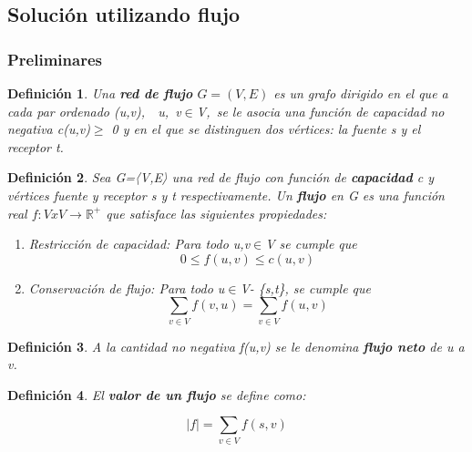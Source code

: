 \documentclass[10pt]{article} %
\newtheorem{mydef}{Definici\'on}%
\begin{document}
	\subsection{Soluci\'on utilizando flujo}
	
	\subsubsection{Preliminares}
	\begin{mydef}
		Una \textbf{red de flujo} $G=(V,E)$ es un grafo dirigido en el que a cada par ordenado (u,v),  u, v$\in$V, se le asocia una función de capacidad no negativa c(u,v)$\geq$ 0 y en el que se distinguen dos vértices: la fuente s y el receptor t.
	\end{mydef}

	\begin{mydef}\label{red_flujo}
		Sea G=〈V,E〉 una red de flujo con función de \textbf{capacidad} c y vértices fuente y receptor s y t respectivamente. Un \textbf{flujo} en G es una función real $f:V x V\rightarrow \mathbb{R}^+$ que satisface las siguientes propiedades:
		
		\begin{enumerate}
			\item Restricci\'on de capacidad: Para todo u,v$\in$V se cumple que
			\begin{equation}
				0 \leq f(u,v) \leq c(u,v)
			\end{equation}
		
			\item Conservaci\'on de flujo: Para todo u$\in$V- \{s,t\}, se cumple que
			\begin{equation}
				\sum_{v \in V} f(v,u) = \sum_{v \in V} f(u,v)
			\end{equation}
			
		\end{enumerate}
		
	\end{mydef}

	\begin{mydef}\label{flujo_neto}
		A la cantidad  no negativa f(u,v) se le denomina \textbf{flujo neto} de u a v.
	\end{mydef}

	\begin{mydef}\label{valor_flujo}
		El \textbf{valor de un flujo} se define como:
		
		\begin{equation}
			|f|=\sum_{v \in V} f(s,v)
		\end{equation}
	\end{mydef}
\end{document}
